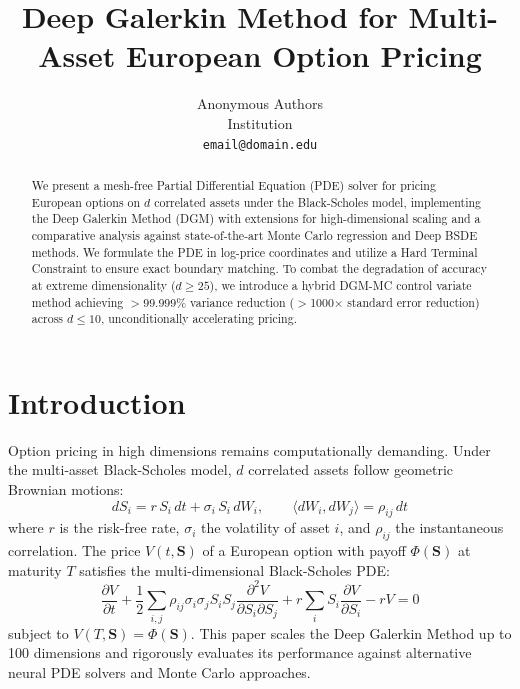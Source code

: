 \documentclass{article}
\title{Deep Galerkin Method for Multi-Asset European Option Pricing}
\author{%
  Anonymous Authors \\
  Institution \\
  \texttt{email@domain.edu} \\
}
\begin{document}
\maketitle

\begin{abstract}
We present a mesh-free Partial Differential Equation (PDE) solver for pricing European options on $d$ correlated assets under the Black-Scholes model, implementing the Deep Galerkin Method (DGM) with extensions for high-dimensional scaling and a comparative analysis against state-of-the-art Monte Carlo regression and Deep BSDE methods. We formulate the PDE in log-price coordinates and utilize a Hard Terminal Constraint to ensure exact boundary matching. To combat the degradation of accuracy at extreme dimensionality ($d \ge 25$), we introduce a hybrid DGM-MC control variate method achieving $>$99.999\% variance reduction ($>$1000$\times$ standard error reduction) across $d \le 10$, unconditionally accelerating pricing.
\end{abstract}

\section{Introduction}
Option pricing in high dimensions remains computationally demanding. Under the multi-asset Black-Scholes model, $d$ correlated assets follow geometric Brownian motions:
\begin{equation}
dS_i = r\,S_i\,dt + \sigma_i\,S_i\,dW_i, \qquad \langle dW_i, dW_j \rangle = \rho_{ij}\,dt
\end{equation}
where $r$ is the risk-free rate, $\sigma_i$ the volatility of asset $i$, and $\rho_{ij}$ the instantaneous correlation. The price $V(t, \mathbf{S})$ of a European option with payoff $\Phi(\mathbf{S})$ at maturity $T$ satisfies the multi-dimensional Black-Scholes PDE:
\begin{equation}
\frac{\partial V}{\partial t} + \frac{1}{2}\sum_{i,j}\rho_{ij}\sigma_i\sigma_j S_i S_j\frac{\partial^2 V}{\partial S_i \partial S_j} + r\sum_i S_i\frac{\partial V}{\partial S_i} - rV = 0
\end{equation}
subject to $V(T, \mathbf{S}) = \Phi(\mathbf{S})$. This paper scales the Deep Galerkin Method \citep{sirignano2018dgm} up to 100 dimensions and rigorously evaluates its performance against alternative neural PDE solvers and Monte Carlo approaches.
\end{document}
